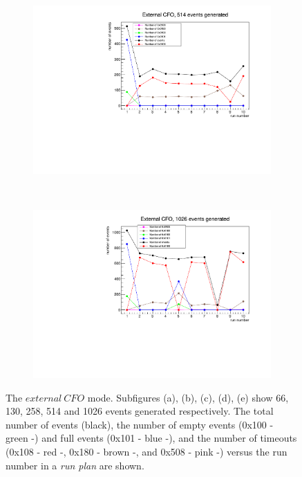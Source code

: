 \begin{figure}[!h]
\begin{subfigure}[t]{0.5\textwidth}
    \caption{}
\end{subfigure}%
~ 
\begin{subfigure}[t]{0.5\textwidth}
    \centering
    \includegraphics[width=1.1\textwidth]{figures/pdf/514.pdf}
    \caption{}
\end{subfigure}
~ 
\begin{subfigure}[t]{0.5\textwidth}
    \centering
    \includegraphics[width=1.1\textwidth]{figures/pdf/1026.pdf}
    \caption{}
\end{subfigure}
  \caption{The  $external \ CFO$ mode. Subfigures (a), (b), (c), (d), (e) show 66, 130, 258, 514 and 1026 events generated respectively. 
  The total number of events (black), the number of empty events (0x100 - green -) and full events (0x101 - blue -), 
  and the number of timeouts (0x108 - red -, 0x180 - brown -, and 0x508 - pink -) versus the run number in a \textit{run plan} are shown.}
  \label{fig:corruption}
\end{figure}




